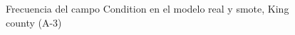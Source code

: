 \begin{figure}[H]
    \centering
    
    \caption{Frecuencia del campo Condition en el modelo real y smote, King county (A-3)}
    \label{frecuency-smote-condition}
\end{figure}